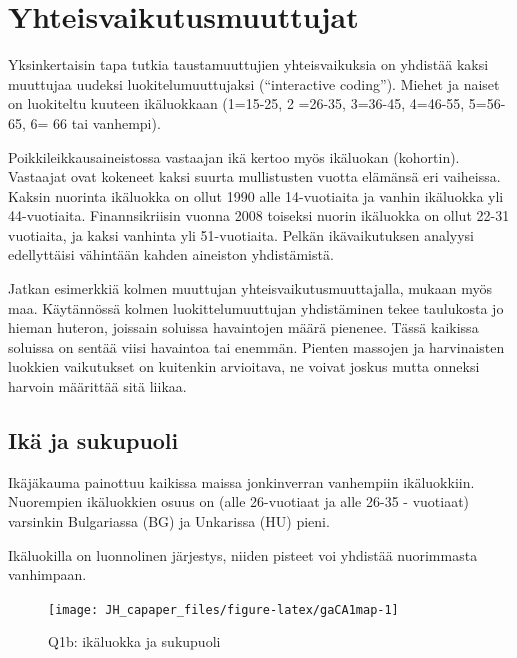 \documentclass[
  finnish,
]{book}
\begin{document}
\hypertarget{yhteisvaikutusmuuttujat}{%
\chapter{Yhteisvaikutusmuuttujat}\label{yhteisvaikutusmuuttujat}}

Yksinkertaisin tapa tutkia taustamuuttujien yhteisvaikuksia on yhdistää kaksi
muuttujaa uudeksi luokitelumuuttujaksi (``interactive coding''). Miehet ja naiset
on luokiteltu kuuteen ikäluokkaan (1=15-25, 2 =26-35, 3=36-45, 4=46-55, 5=56-65,
6= 66 tai vanhempi).

Poikkileikkausaineistossa vastaajan ikä kertoo myös ikäluokan (kohortin).
Vastaajat ovat kokeneet kaksi suurta mullistusten vuotta elämänsä eri vaiheissa.
Kaksin nuorinta ikäluokka on ollut 1990 alle 14-vuotiaita ja vanhin ikäluokka
yli 44-vuotiaita. Finannsikriisin vuonna 2008 toiseksi nuorin ikäluokka on ollut
22-31 vuotiaita, ja kaksi vanhinta yli 51-vuotiaita. Pelkän ikävaikutuksen
analyysi edellyttäisi vähintään kahden aineiston yhdistämistä.

Jatkan esimerkkiä kolmen muuttujan yhteisvaikutusmuuttajalla, mukaan
myös maa. Käytännössä kolmen luokittelumuuttujan yhdistäminen tekee taulukosta
jo hieman huteron, joissain soluissa havaintojen määrä pienenee. Tässä kaikissa
soluissa on sentää viisi havaintoa tai enemmän. Pienten massojen ja harvinaisten
luokkien vaikutukset on kuitenkin arvioitava, ne voivat joskus mutta onneksi
harvoin määrittää sitä liikaa.

\hypertarget{ikuxe4-ja-sukupuoli}{%
\section{Ikä ja sukupuoli}\label{ikuxe4-ja-sukupuoli}}

Ikäjäkauma painottuu kaikissa maissa jonkinverran vanhempiin ikäluokkiin.
Nuorempien ikäluokkien osuus on (alle 26-vuotiaat ja alle 26-35 - vuotiaat)
varsinkin Bulgariassa (BG) ja Unkarissa (HU) pieni.

Ikäluokilla on luonnolinen järjestys, niiden pisteet voi yhdistää nuorimmasta
vanhimpaan.

\begin{figure}

{\centering \texttt{[image: JH\_capaper\_files/figure-latex/gaCA1map-1]} 

}

\caption{Q1b: ikäluokka ja sukupuoli}\label{fig:gaCA1map}
\end{figure}
\end{document}
